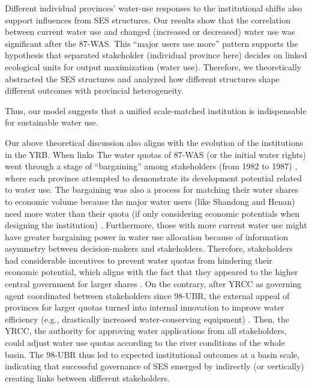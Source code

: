 \label{discussion-2}
Different individual provinces' water-use responses to the institutional shifts also support influences from SES structures.
Our results show that the correlation between current water use and changed (increased or decreased) water use was significant after the 87-WAS.
This ``major users use more'' pattern supports the hypothesis that separated stakeholder (individual province here) decides on linked ecological units for output maximization (water use).
Therefore, we theoretically abstracted the SES structures and analyzed how different structures shape different outcomes with provincial heterogeneity.

Thus, our model suggests that a unified scale-matched institution is indispensable for sustainable water use.

Our above theoretical discussion also aligns with the evolution of the institutions in the YRB.
When links The water quotas of 87-WAS (or the initial water rights) went through a stage of ``bargaining'' among stakeholders (from 1982 to 1987) \cite{wang2019a, wang2019d}, where each province attempted to demonstrate its development potential related to water use.
The bargaining was also a process for matching their water shares to economic volume because the major water users (like Shandong and Henan) need more water than their quota (if only considering economic potentials when designing the institution) \cite{zuo2020}.
Furthermore, those with more current water use might have greater bargaining power in water use allocation because of information asymmetry between decision-makers and stakeholders.
Therefore, stakeholders had considerable incentives to prevent water quotas from hindering their economic potential, which aligns with the fact that they appeared to the higher central government for larger shares \cite{wang2019a, wang2019d}.
On the contrary, after YRCC as governing agent coordinated between stakeholders since 98-UBR, the external appeal of provinces for larger quotas turned into internal innovation to improve water efficiency (e.g., drastically increased water-conserving equipment)
\cite{krieger1955, ostrom1990}.
Then, the YRCC, the authority for approving water applications from all stakeholders, could adjust water use quotas according to the river conditions of the whole basin.
The 98-UBR thus led to expected institutional outcomes at a basin scale, indicating that successful governance of SES emerged by indirectly (or vertically) creating links between different stakeholders.

